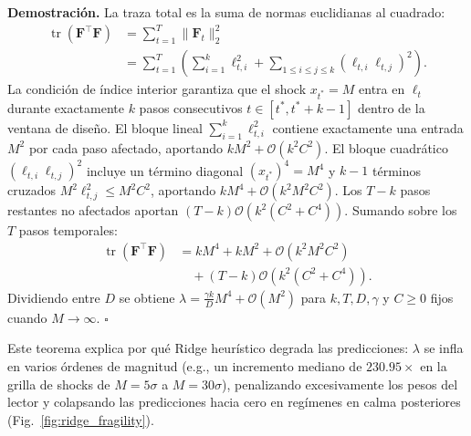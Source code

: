 \documentclass[aip,cha,reprint,amsmath,amssymb]{revtex4-2}
\begin{document}
\textbf{Demostración.} La traza total es la suma de normas euclidianas al cuadrado:
\begin{align}
\operatorname{tr}(\mathbf{F}^\top\mathbf{F}) &= \sum_{t=1}^T \|\mathbf{F}_t\|_2^2 \nonumber\\
&= \sum_{t=1}^T \left( \sum_{i=1}^k \ell_{t,i}^2 + \sum_{1 \le i \le j \le k} (\ell_{t,i}\ell_{t,j})^2 \right).
\end{align}
La condición de índice interior garantiza que el shock $x_{t^*} = M$ entra en $\bm{\ell}_t$ durante exactamente $k$ pasos consecutivos $t \in [t^*, t^* + k - 1]$ dentro de la ventana de diseño. El bloque lineal $\sum_{i=1}^k \ell_{t,i}^2$ contiene exactamente una entrada $M^2$ por cada paso afectado, aportando $k M^2 + \mathcal{O}(k^2 C^2)$. El bloque cuadrático $(\ell_{t,i}\ell_{t,j})^2$ incluye un término diagonal $(x_{t^*})^4 = M^4$ y $k-1$ términos cruzados $M^2 \ell_{t,j}^2 \le M^2 C^2$, aportando $k M^4 + \mathcal{O}(k^2 M^2 C^2)$. Los $T-k$ pasos restantes no afectados aportan $(T-k)\mathcal{O}(k^2(C^2 + C^4))$. Sumando sobre los $T$ pasos temporales:
\begin{align}
\operatorname{tr}(\mathbf{F}^\top\mathbf{F}) &= k M^4 + k M^2 + \mathcal{O}(k^2 M^2 C^2) \nonumber\\
&\quad + (T-k) \mathcal{O}(k^2 (C^2 + C^4)).
\end{align}
Dividiendo entre $D$ se obtiene $\lambda = \frac{\gamma k}{D} M^4 + \mathcal{O}(M^2)$ para $k, T, D, \gamma$ y $C \ge 0$ fijos cuando $M \to \infty$. $\square$

Este teorema explica por qué Ridge heurístico degrada las predicciones: $\lambda$ se infla en varios órdenes de magnitud (e.g., un incremento mediano de $230.95\times$ en la grilla de shocks de $M=5\sigma$ a $M=30\sigma$), penalizando excesivamente los pesos del lector y colapsando las predicciones hacia cero en regímenes en calma posteriores (Fig.~\ref{fig:ridge_fragility}).
\end{document}
